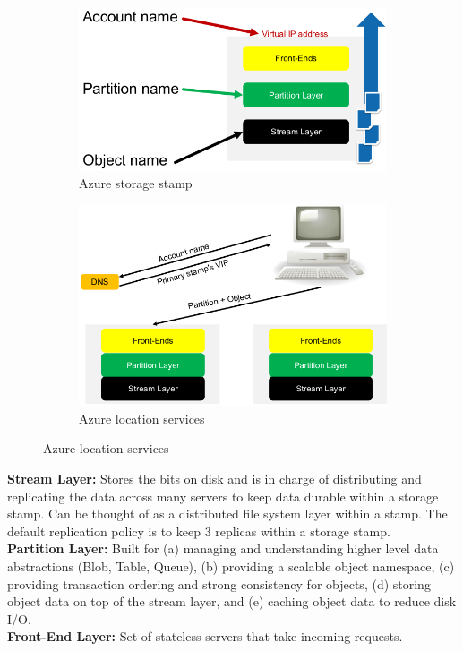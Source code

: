 \documentclass[11pt,oneside,a4paper]{article}
\begin{document}
\vspace{-\topsep}
\begin{figure}[hb!]
	\centering
	\begin{subfigure}[t]{.5\textwidth}
		\centering
		\includegraphics[width=0.5\linewidth]{figures/azure_storage_stamp}
		\caption{Azure storage stamp}
		\label{fig:azure_storage_stamp}
	\end{subfigure}%
	\begin{subfigure}[t]{.5\textwidth}
		\centering
		\includegraphics[width=0.6\linewidth]{figures/azure_location_services}
		\caption{Azure location services}
		\label{fig:azure_location_services}
	\end{subfigure}
\end{figure}

\textbf{Stream Layer:} Stores the bits on disk and is in charge of distributing and replicating the data across many servers to keep data durable within a storage stamp. Can be thought of as a distributed file system layer within a stamp. The default replication policy is to keep 3 replicas within a storage stamp.\\
\textbf{Partition Layer:} Built for (a) managing and understanding higher level data abstractions (Blob, Table, Queue), (b) providing a scalable object namespace, (c) providing transaction ordering and strong consistency for objects, (d) storing object data on top of the stream layer, and (e) caching object data to reduce disk I/O.\\
\textbf{Front-End Layer:} Set of stateless servers that take incoming requests.\\
\end{document}
